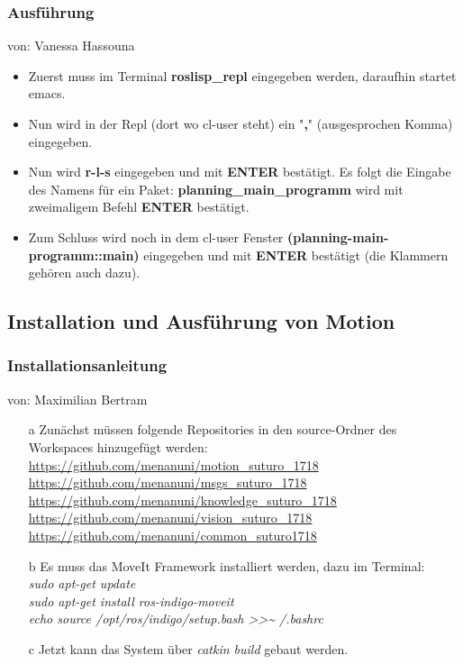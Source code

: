 \documentclass{suturo}
\makeatletter
\newcommand{\chapterauthor}[1]{%
  {\parindent0pt\vspace*{-27pt}%
  \linespread{0}\small\begin{flushright}von: #1\end{flushright}%
  \par\nobreak\vspace*{0pt}}
  \@afterheading%
}
\makeatother
\begin{document}
\subsubsection{Ausführung}
\chapterauthor{Vanessa Hassouna}
\begin{itemize}

\item Zuerst muss im Terminal \textbf{roslisp\_repl} eingegeben werden, daraufhin startet emacs. 

\item Nun wird in der Repl (dort wo cl-user steht) ein "\textbf{,}" (ausgesprochen Komma) eingegeben.

\item Nun wird \textbf{r-l-s} eingegeben und mit \textbf{ENTER} bestätigt. Es folgt die Eingabe des Namens für ein Paket: \textbf{planning\_main\_programm} wird mit zweimaligem Befehl \textbf{ENTER} bestätigt.

\item Zum Schluss wird noch in dem cl-user Fenster \textbf{(planning-main-programm::main)} eingegeben und mit \textbf{ENTER} bestätigt (die Klammern gehören auch dazu).
\end{itemize}


\subsection{Installation und Ausführung von Motion}

\subsubsection{Installationsanleitung}
\chapterauthor{Maximilian Bertram}

\begin{itemize}
\item[a] Zunächst müssen folgende Repositories in den source-Ordner des Workspaces hinzugefügt werden:  \\
\url{https://github.com/menanuni/motion_suturo_1718} \\
\url{https://github.com/menanuni/msgs_suturo_1718} \\
\url{https://github.com/menanuni/knowledge_suturo_1718} \\
\url{https://github.com/menanuni/vision_suturo_1718} \\
\url{https://github.com/menanuni/common_suturo1718} \\

\item[b] Es muss das MoveIt Framework installiert werden, dazu im Terminal: \\
\textit{sudo apt-get update} \\
\textit{sudo apt-get install ros-indigo-moveit} \\
\textit{echo  \grqq{}source /opt/ros/indigo/setup.bash\grqq{} \textgreater\textgreater \textasciitilde{ }/.bashrc} \\

\item[c] Jetzt kann das System über \textit{catkin build} gebaut werden.
\end{itemize}
\end{document}
